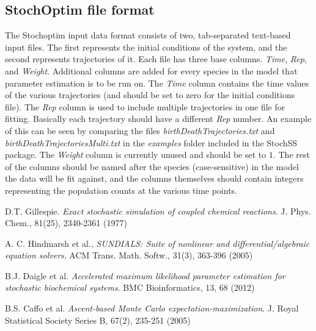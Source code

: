 \documentclass[12pt,notitlepage,nofootinbib]{revtex4}
\begin{document}
\subsection{StochOptim file format}
The Stochoptim input data format consists of two, tab-separated text-based input files.
The first represents the initial conditions of the system, and the second represents trajectories of it.
Each file has three base columns. \textit{Time}, \textit{Rep}, and \textit{Weight}. Additional columns are added for every species in the model that parameter estimation is to be run on. The \textit{Time} column contains the time values of the various trajectories (and should be set to zero for the initial conditions file). The \textit{Rep} column is used to include multiple trajectories in one file for fitting. Basically each trajectory should have a different \textit{Rep} number. An example of this can be seen by comparing the files \textit{birthDeathTrajectories.txt} and \textit{birthDeathTrajectoriesMulti.txt} in the \textit{examples} folder included in the StochSS package. The \textit{Weight} column is currently unused and should be set to $1$. The rest of the columns should be named after the species (case-sensitive) in the model the data will be fit against, and the columns themselves should contain integers representing the population counts at the various time points.

\newpage

\begin{thebibliography}{9}
  
  D.T. Gillespie.
  \textit{Exact stochastic simulation of coupled chemical reactions}.
  J. Phys. Chem., 81(25), 2340-2361 (1977)
  
  A. C. Hindmarsh et al.,
  \textit{SUNDIALS: Suite of nonlinear and differential/algebraic equation solvers}.
  ACM Trans. Math. Softw., 31(3), 363-396 (2005)
  
  B.J. Daigle et al.
  \textit{Accelerated maximum likelihood parameter estimation for stochastic biochemical systems}.
  BMC Bioinformatics, 13, 68 (2012)
  
  B.S. Caffo et al.
  \textit{Ascent-based Monte Carlo expectation-maximization}. 
  J. Royal Statistical Society Series B, 67(2), 235-251 (2005)
  
\end{thebibliography}
\end{document}
